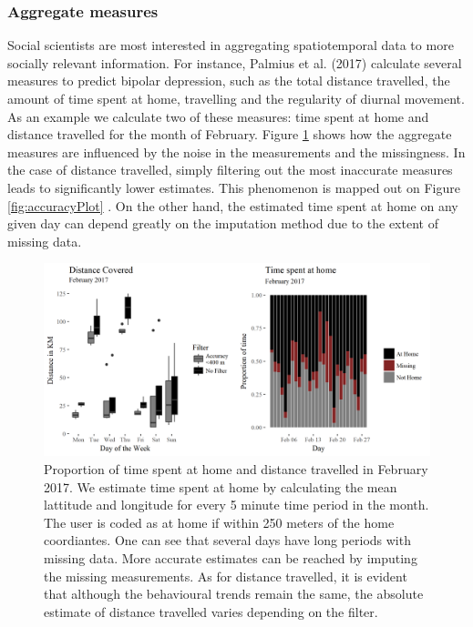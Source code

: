 \documentclass[english,man]{apa6}
\theoremstyle{definition}
\theoremstyle{definition}
\theoremstyle{definition}
\theoremstyle{remark}
\begin{document}
\subsubsection{Aggregate measures}\label{aggregate-measures}

Social scientists are most interested in aggregating spatiotemporal data
to more socially relevant information. For instance, Palmius et al.
(2017) calculate several measures to predict bipolar depression, such as
the total distance travelled, the amount of time spent at home,
travelling and the regularity of diurnal movement. As an example we
calculate two of these measures: time spent at home and distance
travelled for the month of February. Figure \ref{fig:aggrePlot} shows
how the aggregate measures are influenced by the noise in the
measurements and the missingness. In the case of distance travelled,
simply filtering out the most inaccurate measures leads to significantly
lower estimates. This phenomenon is mapped out on Figure
\ref{fig:accuracyPlot} . On the other hand, the estimated time spent at
home on any given day can depend greatly on the imputation method due to
the extent of missing data.

\begin{figure}
\includegraphics[width=1\linewidth]{img/aggPlot} \caption{Proportion of time spent at home  and distance travelled in February 2017. We estimate time spent at home by calculating the mean lattitude and longitude for every 5 minute time period in the month. The user is coded as at home if within 250 meters of the home coordiantes. One can see that several days have long periods with missing data. More accurate estimates can be reached by imputing the missing measurements. As for distance travelled, it is evident that although the behavioural trends remain the same, the absolute estimate of distance travelled varies depending on the filter.}\label{fig:aggrePlot}
\end{figure}
\end{document}
